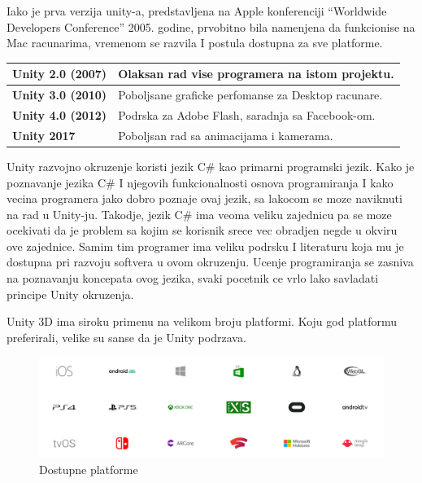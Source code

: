\documentclass[12pt]{article}
\begin{document}
Iako je prva verzija unity-a, predstavljena na Apple konferenciji “Worldwide Developers Conference” 2005. godine, prvobitno bila namenjena da funkcionise na Mac racunarima, vremenom se razvila I postula dostupna za sve platforme. 

\begin{table}[ht!]
\begin{tabular}{|l|l|}
\hline
\multicolumn{1}{|c|}{\textbf{Unity 2.0 (2007)}} & Olaksan rad vise programera na istom projektu.\\ \hline
\textbf{Unity 3.0 (2010)}                       & Poboljsane graficke perfomanse za Desktop racunare.                               \\ \hline
\textbf{Unity 4.0 (2012)}                       & Podrska za Adobe Flash, saradnja sa Facebook-om. \\ \hline
\textbf{Unity 2017}                             & Poboljsan rad sa animacijama i kamerama. \\ \hline
\end{tabular}
\end{table}

Unity razvojno okruzenje koristi jezik C# kao primarni programski jezik.
Kako je poznavanje jezika C# I njegovih funkcionalnosti osnova programiranja I kako vecina programera jako dobro poznaje ovaj jezik, sa lakocom se moze naviknuti na rad u Unity-ju. Takodje, jezik C# ima veoma veliku zajednicu pa se moze ocekivati da je problem sa kojim se korisnik srece vec obradjen negde u okviru ove zajednice. Samim tim programer ima veliku podrsku I literaturu koja mu je dostupna pri razvoju softvera u ovom okruzenju. Ucenje programiranja se zasniva na poznavanju koncepata ovog jezika, svaki pocetnik ce vrlo lako savladati principe Unity okruzenja. 

Unity 3D ima siroku primenu na velikom broju platformi.
Koju god platformu preferirali, velike su sanse da je Unity podrzava.

\begin{figure}[ht!]
    \centering
    \includegraphics[scale=0.2]{platforme.png}
    \caption{Dostupne platforme}
\end{figure}
\end{document}

